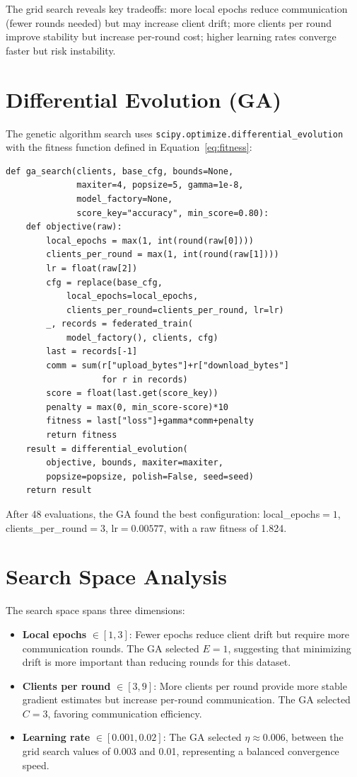 \documentclass[11pt,a4paper]{report}
\begin{document}
The grid search reveals key tradeoffs: more local epochs reduce communication (fewer rounds needed) but may increase client drift; more clients per round improve stability but increase per-round cost; higher learning rates converge faster but risk instability.

\section{Differential Evolution (GA)}

The genetic algorithm search uses \texttt{scipy.optimize.differential\_evolution} with the fitness function defined in Equation~\ref{eq:fitness}:

\begin{lstlisting}
def ga_search(clients, base_cfg, bounds=None,
              maxiter=4, popsize=5, gamma=1e-8,
              model_factory=None,
              score_key="accuracy", min_score=0.80):
    def objective(raw):
        local_epochs = max(1, int(round(raw[0])))
        clients_per_round = max(1, int(round(raw[1])))
        lr = float(raw[2])
        cfg = replace(base_cfg,
            local_epochs=local_epochs,
            clients_per_round=clients_per_round, lr=lr)
        _, records = federated_train(
            model_factory(), clients, cfg)
        last = records[-1]
        comm = sum(r["upload_bytes"]+r["download_bytes"]
                   for r in records)
        score = float(last.get(score_key))
        penalty = max(0, min_score-score)*10
        fitness = last["loss"]+gamma*comm+penalty
        return fitness
    result = differential_evolution(
        objective, bounds, maxiter=maxiter,
        popsize=popsize, polish=False, seed=seed)
    return result
\end{lstlisting}

After 48 evaluations, the GA found the best configuration: local\_epochs$=1$, clients\_per\_round$=3$, lr$=0.00577$, with a raw fitness of 1.824.

\section{Search Space Analysis}

The search space spans three dimensions:
\begin{itemize}[leftmargin=2em]
\item \textbf{Local epochs} $\in [1, 3]$: Fewer epochs reduce client drift but require more communication rounds. The GA selected $E=1$, suggesting that minimizing drift is more important than reducing rounds for this dataset.
\item \textbf{Clients per round} $\in [3, 9]$: More clients per round provide more stable gradient estimates but increase per-round communication. The GA selected $C=3$, favoring communication efficiency.
\item \textbf{Learning rate} $\in [0.001, 0.02]$: The GA selected $\eta \approx 0.006$, between the grid search values of 0.003 and 0.01, representing a balanced convergence speed.
\end{itemize}
\end{document}

